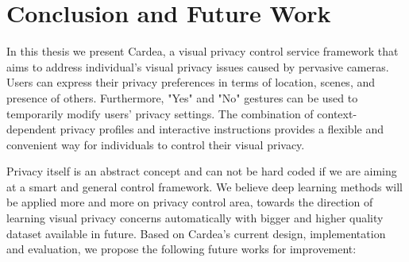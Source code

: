 \chapter{Conclusion and Future Work}\label{sec-conclusion}

In this thesis we present Cardea, a visual privacy control service framework that aims to address individual's visual privacy issues caused by pervasive cameras. Users can express their privacy preferences in terms of location, scenes, and presence of others. Furthermore, "Yes" and "No" gestures can be used to temporarily modify users' privacy settings. The combination of context-dependent privacy profiles and interactive instructions provides a flexible and convenient way for individuals to control their visual privacy.



Privacy itself is an abstract concept and can not be hard coded if we are aiming at a smart and general control framework. We believe deep learning methods will be applied more and more on privacy control area, towards the direction of learning visual privacy concerns automatically with bigger and higher quality dataset available in future. Based on Cardea's current design, implementation and evaluation, we propose the following future works for improvement:

